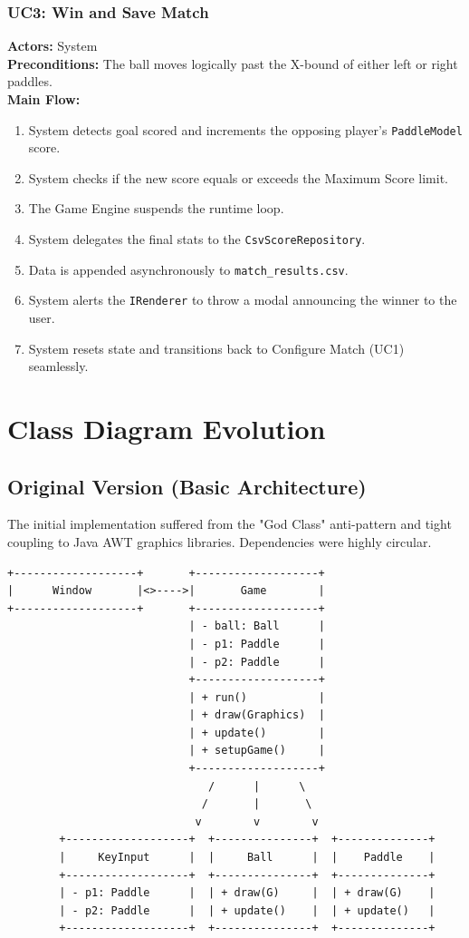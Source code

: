 \documentclass[12pt, a4paper]{article}
\begin{document}
\subsubsection*{UC3: Win and Save Match}
\textbf{Actors:} System \\
\textbf{Preconditions:} The ball moves logically past the X-bound of either left or right paddles. \\
\textbf{Main Flow:}
\begin{enumerate}
    \item System detects goal scored and increments the opposing player's \texttt{PaddleModel} score.
    \item System checks if the new score equals or exceeds the Maximum Score limit.
    \item The Game Engine suspends the runtime loop.
    \item System delegates the final stats to the \texttt{CsvScoreRepository}.
    \item Data is appended asynchronously to \texttt{match\_results.csv}.
    \item System alerts the \texttt{IRenderer} to throw a modal announcing the winner to the user.
    \item System resets state and transitions back to Configure Match (UC1) seamlessly.
\end{enumerate}

\newpage
\section{Class Diagram Evolution}

\subsection{Original Version (Basic Architecture)}
The initial implementation suffered from the "God Class" anti-pattern and tight coupling to Java AWT graphics libraries. Dependencies were highly circular.

\begin{verbatim}
+-------------------+       +-------------------+
|      Window       |<>---->|       Game        |
+-------------------+       +-------------------+
                            | - ball: Ball      |
                            | - p1: Paddle      |
                            | - p2: Paddle      |
                            +-------------------+
                            | + run()           |
                            | + draw(Graphics)  |
                            | + update()        |
                            | + setupGame()     |
                            +-------------------+
                               /      |      \
                              /       |       \
                             v        v        v
        +-------------------+  +---------------+  +--------------+
        |     KeyInput      |  |     Ball      |  |    Paddle    |
        +-------------------+  +---------------+  +--------------+
        | - p1: Paddle      |  | + draw(G)     |  | + draw(G)    |
        | - p2: Paddle      |  | + update()    |  | + update()   |
        +-------------------+  +---------------+  +--------------+
\end{verbatim}
\end{document}
